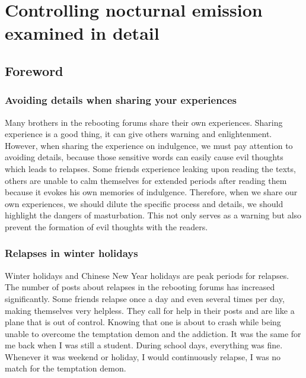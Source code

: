 \documentclass[
]{book}
\begin{document}
\hypertarget{controlling-nocturnal-emission-examined-in-detail}{%
\chapter{Controlling nocturnal emission examined in detail}\label{controlling-nocturnal-emission-examined-in-detail}}

\hypertarget{foreword-16}{%
\section{Foreword}\label{foreword-16}}

\hypertarget{avoiding-details-when-sharing-your-experiences}{%
\subsection{Avoiding details when sharing your experiences}\label{avoiding-details-when-sharing-your-experiences}}

Many brothers in the rebooting forums share their own experiences. Sharing experience is a good thing, it can give others warning and enlightenment. However, when sharing the experience on indulgence, we must pay attention to avoiding details, because those sensitive words can easily cause evil thoughts which leads to relapses. Some friends experience leaking upon reading the texts, others are unable to calm themselves for extended periods after reading them because it evokes his own memories of indulgence. Therefore, when we share our own experiences, we should dilute the specific process and details, we should highlight the dangers of masturbation. This not only serves as a warning but also prevent the formation of evil thoughts with the readers.

\hypertarget{relapses-in-winter-holidays}{%
\subsection{Relapses in winter holidays}\label{relapses-in-winter-holidays}}

Winter holidays and Chinese New Year holidays are peak periods for relapses. The number of posts about relapses in the rebooting forums has increased significantly. Some friends relapse once a day and even several times per day, making themselves very helpless. They call for help in their posts and are like a plane that is out of control. Knowing that one is about to crash while being unable to overcome the temptation demon and the addiction. It was the same for me back when I was still a student. During school days, everything was fine. Whenever it was weekend or holiday, I would continuously relapse, I was no match for the temptation demon.
\end{document}
